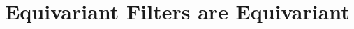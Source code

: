 \documentclass{article}
\begin{document}



\newcommand{\papercitation}{%
Under Review.
}
\newcommand{\linktopaper}{%
https://arxiv.org/}
\newcommand{\DOInumber}{%
}
\newcommand{\publicationdetails}
{\copyrightNoticeIFACSubmitted
This research was supported by the Australian Research Council through the Discovery Project DP210102607.
}
\newcommand{\publicationversion}
{Preprint}




\title{Equivariant Filters are Equivariant}
\end{document}

